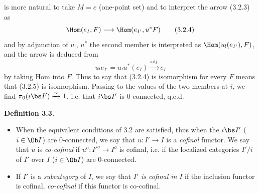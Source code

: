 
is more natural to take $M = e$ (one-point set) and to interpret the arrow (3.2.3) as
\[
\Hom(e_I, F) \longrightarrow \Hom(e_{I'}, u^*F)
\tag*{(3.2.4)}
\]
and by adjunction of $u_!$, $u^*$ the second member is interpreted as $\Hom(u_!(e_{I'}), F)$, and the arrow is deduced from
\[
u_!e_{I'} = u_!u^*(e_I) \xrightarrow{\text{adj.}} e_I
\tag*{(3.2.5)}
\]
by taking Hom into $F$. Thus to say that (3.2.4) is isomorphism for every $F$ means that (3.2.5) is isomorphism. Passing to the values of the two members at $i$, we find $\pi_0(i\bs I') \xrightarrow{\sim} 1$, i.e. that $i\bs I'$ is 0-connected, q.e.d.

\noindent\textbf{Definition 3.3.}
\begin{itemize}[label={}]
\item[a)] When the equivalent conditions of 3.2 are satisfied, thus when the $i\bs I'$ ($i \in \Ob I$) are 0-connected, we say that $u : I' \longrightarrow I$ is a \textit{cofinal} functor. We say that $u$ is \textit{co-cofinal} if $u^o : I'^o \longrightarrow I^o$ is cofinal, i.e. if the localized categories $I'/i$ of $I'$ over $I$ ($i \in \Ob I$) are 0-connected.
\item[b)] If $I'$ is a \textit{subcategory} of $I$, we say that $I'$ \textit{is cofinal in} $I$ if the inclusion functor is cofinal, \textit{co-cofinal} if this functor is co-cofinal.
\end{itemize}

